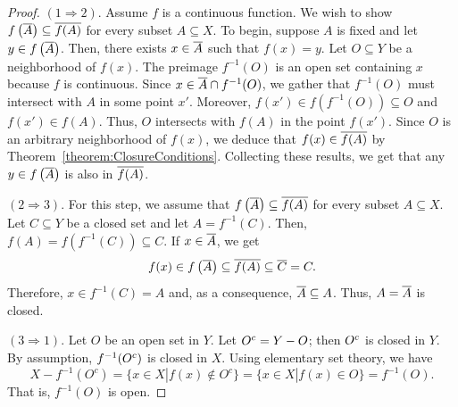 \begin{proof}
$(1 \Rightarrow 2)$.
Assume $f$ is a continuous function.
We wish to show $f \left( \overline{A} \right) \subseteq \overline{ f(A) }$ for every subset $A \subseteq X$.
To begin, suppose $A$ is fixed and let $y \in f \left( \overline{A} \right)$.
Then, there exists $x \in \overline{A}$ such that $f(x) = y$.
Let $O \subseteq Y$ be a neighborhood of $f(x)$.
The preimage $f^{-1}(O)$ is an open set containing $x$ because $f$ is continuous.
Since $x \in \overline{A} \cap f^{-1}(O)$, we gather that $f^{-1}(O)$ must intersect with $A$ in some point $x'$.
Moreover, $f(x') \in f \left( f^{-1}(O) \right) \subseteq O$ and $f(x') \in f(A)$.
Thus, $O$ intersects with $f(A)$ in the point $f(x')$.
Since $O$ is an arbitrary neighborhood of $f(x)$, we deduce that $f(x) \in \overline{ f(A) }$ by Theorem~\ref{theorem:ClosureConditions}.
Collecting these results, we get that any $y \in f \left( \overline{A} \right)$ is also in $\overline{ f(A) }$.

$(2 \Rightarrow 3)$.
For this step, we assume that $f \left( \overline{A} \right) \subseteq \overline{ f(A) }$ for every subset $A \subseteq X$.
Let $C \subseteq Y$ be a closed set and let $A = f^{-1} (C)$.
Then, $f(A) = f \left( f^{-1}(C) \right) \subseteq C$.
If $x \in \overline{A}$, we get
\begin{equation*}
f(x) \in f \left( \overline{A} \right) \subseteq \overline{f (A)} \subseteq \overline{C} = C.
\end{equation*}
Therefore, $x \in f^{-1} (C) = A$ and, as a consequence, $\overline{A} \subseteq A$.
Thus, $A = \overline{A}$ is closed.

$(3 \Rightarrow 1)$.
Let $O$ be an open set in $Y$.
Let ${O}^{c} = Y - O$; then ${O}^{c}$ is closed in $Y$.
By assumption, $f^{-1} ({O}^{c})$ is closed in $X$.
Using elementary set theory, we have
\begin{equation*}
X - f^{-1}(O^c) = \{ x\in X | f(x) \notin O^c \} = \{ x \in X | f(x) \in O \} = f^{-1} (O).
\end{equation*}
That is, $f^{-1} (O)$ is open.
\end{proof}

